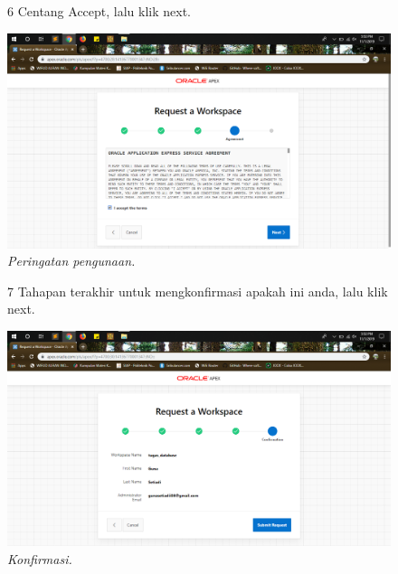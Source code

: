 \begin{enumerate}
\begin{figure}
\label{gambar}
\end{figure}

\begin{figure}
\item[6] Centang Accept, lalu klik next.

    \begin{center}
\includegraphics[scale=0.2]{figures/g4.png}
    \caption{\textit{Peringatan pengunaan.}}
        \end{center}

\label{gambar}
\end{figure}

\begin{figure}
\item[7] Tahapan terakhir untuk mengkonfirmasi apakah ini anda, lalu klik next.

    \begin{center}
\includegraphics[scale=0.2]{figures/g5.png}
    \caption{\textit{Konfirmasi.}}
        \end{center}
\label{gambar}
\end{figure}


\end{enumerate}
